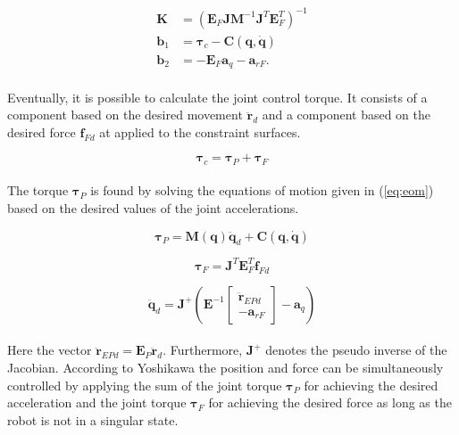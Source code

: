 \begin{equation}
    \begin{split}
        \mathbf{K} &= (\mathbf{E}_F \mathbf{J} \mathbf{M}^{-1} \mathbf{J}^T \mathbf{E}^T_F)^{-1}\\
        \mathbf{b}_1 &= \boldsymbol{\tau}_c - \mathbf{C(q, \dot{q})}\\
        \mathbf{b}_2 &= - \mathbf{E}_F \mathbf{a}_q - \mathbf{a}_{rF}.
    \end{split}
\end{equation}
\\
Eventually, it is possible to calculate the joint control torque. It consists of a component based on the desired movement $\mathbf{\ddot{r}}_d$ and a component based on the desired force $\mathbf{f}_{Fd}$ at applied to the constraint surfaces.

\begin{equation}\label{eq:dhpfc_tau_c}
    \boldsymbol{\tau}_c = \boldsymbol{\tau}_P + \boldsymbol{\tau}_F
\end{equation}
\\
The torque $\boldsymbol{\tau}_P$ is found by solving the equations of motion given in (\ref{eq:eom}) based on the desired values of the joint accelerations.

\begin{equation}
    \boldsymbol{\tau}_P = \mathbf{M(q)} \ddot{\mathbf{q}}_d + \mathbf{C}(\mathbf{q,\dot{q}})
\end{equation}

\begin{equation}
    \boldsymbol{\tau}_F = \mathbf{J}^T \mathbf{E}^T_F \mathbf{f}_{Fd}
\end{equation}

\begin{equation}\label{eq:dhpfc_qddd}
    \ddot{\mathbf{q}}_d = \mathbf{J}^+ (\mathbf{E}^{-1} 
    \begin{bmatrix}
        \mathbf{\ddot{r}}_{EPd} \\
        - \mathbf{a}_{rF}
    \end{bmatrix}
    - \mathbf{a}_q)
\end{equation}
\\
Here the vector $\mathbf{\ddot{r}}_{EPd} = \mathbf{E}_P \mathbf{\ddot{r}}_{d}$. Furthermore, $\mathbf{J}^+$ denotes the pseudo inverse of the Jacobian. According to Yoshikawa \cite{yoshikawa1987dynamic} the position and force can be simultaneously controlled by applying the sum of the joint torque $\boldsymbol{\tau}_P$ for achieving the desired acceleration and the joint torque $\boldsymbol{\tau}_F$ for achieving the desired force as long as the robot is not in a singular state.

